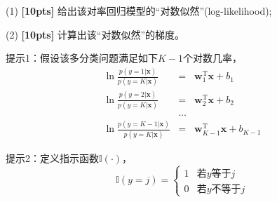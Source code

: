 \documentclass[a4paper,UTF8]{article}
\numberwithin{equation}{section}
\theoremstyle{definition}
\begin{document}
(1) \textbf{[10pts]} 给出该对率回归模型的“对数似然”(log-likelihood);

(2) \textbf{[10pts]} 计算出该“对数似然”的梯度。

提示1：假设该多分类问题满足如下$K-1$个对数几率，
\begin{eqnarray*}
\ln\frac{p(y=1|\mathbf{x})}{p(y=K|\mathbf{x})}&=&\mathbf{w}_1^\mathrm{T}\mathbf{x}+b_1\\
\ln\frac{p(y=2|\mathbf{x})}{p(y=K|\mathbf{x})}&=&\mathbf{w}_2^\mathrm{T}\mathbf{x}+b_2\\
&\dots&\\
\ln\frac{p(y={K-1}|\mathbf{x})}{p(y=K|\mathbf{x})}&=&\mathbf{w}_{K-1}^\mathrm{T}\mathbf{x}+b_{K-1}
\end{eqnarray*}

提示2：定义指示函数$\mathbb{I}(\cdot)$，
$$\mathbb{I}(y=j)=
\begin{cases}
1& \text{若$y$等于$j$}\\
0& \text{若$y$不等于$j$}
\end{cases}$$
\end{document}
